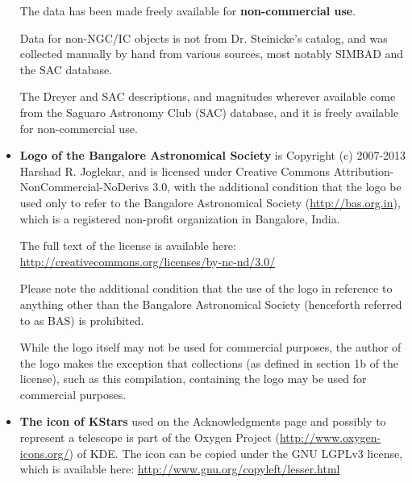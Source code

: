 \begin{itemize}
  The data has been made freely available for \textbf{non-commercial
    use}.

  Data for non-NGC/IC objects is not from Dr. Steinicke's catalog, and
  was collected manually by hand from various sources, most notably
  SIMBAD and the SAC database.

  The Dreyer and SAC descriptions, and magnitudes wherever available
  come from the Saguaro Astronomy Club (SAC) database, and it is
  freely available for non-commercial use.

\item \textbf{Logo of the Bangalore Astronomical Society} is Copyright
  (c) 2007-2013 Harshad R. Joglekar, and is licensed under Creative
  Commons Attribution-NonCommercial-NoDerivs 3.0, with the additional
  condition that the logo be used only to refer to the Bangalore
  Astronomical Society (\url{http://bas.org.in}), which is a
  registered non-profit organization in Bangalore, India. 

  The full text of the license is available here:
  \url{http://creativecommons.org/licenses/by-nc-nd/3.0/}

  Please note the additional condition that the use of the logo in
  reference to anything other than the Bangalore Astronomical Society
  (henceforth referred to as BAS) is prohibited.

  While the logo itself may not be used for commercial purposes, the
  author of the logo makes the exception that collections (as defined
  in section 1b of the license), such as this compilation, containing
  the logo may be used for commercial purposes.


\item \textbf{The icon of KStars} used on the Acknowledgments page
  and possibly to represent a telescope is part of the Oxygen Project
  (\url{http://www.oxygen-icons.org/}) of KDE. The icon can be copied
  under the GNU LGPLv3 license, which is available here:
  \url{http://www.gnu.org/copyleft/lesser.html}


\end{itemize}
